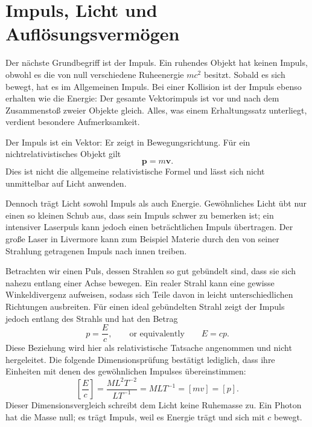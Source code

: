 \section{Impuls, Licht und Auflösungsvermögen}

Der nächste Grundbegriff ist der Impuls. Ein ruhendes Objekt hat keinen Impuls, obwohl es die von null verschiedene Ruheenergie \(mc^2\) besitzt. Sobald es sich bewegt, hat es im Allgemeinen Impuls. Bei einer Kollision ist der Impuls ebenso erhalten wie die Energie: Der gesamte Vektorimpuls ist vor und nach dem Zusammenstoß zweier Objekte gleich. Alles, was einem Erhaltungssatz unterliegt, verdient besondere Aufmerksamkeit.

Der Impuls ist ein Vektor: Er zeigt in Bewegungsrichtung. Für ein nichtrelativistisches Objekt gilt
\begin{equation}
\mathbf p=m\mathbf v.
\end{equation}
Dies ist nicht die allgemeine relativistische Formel und lässt sich nicht unmittelbar auf Licht anwenden.

Dennoch trägt Licht sowohl Impuls als auch Energie. Gewöhnliches Licht übt nur einen so kleinen Schub aus, dass sein Impuls schwer zu bemerken ist; ein intensiver Laserpuls kann jedoch einen beträchtlichen Impuls übertragen. Der große Laser in Livermore kann zum Beispiel Materie durch den von seiner Strahlung getragenen Impuls nach innen treiben.

Betrachten wir einen Puls, dessen Strahlen so gut gebündelt sind, dass sie sich nahezu entlang einer Achse bewegen. Ein realer Strahl kann eine gewisse Winkeldivergenz aufweisen, sodass sich Teile davon in leicht unterschiedlichen Richtungen ausbreiten. Für einen ideal gebündelten Strahl zeigt der Impuls jedoch entlang des Strahls und hat den Betrag
\begin{equation}
p=\frac{E}{c},
\qquad\text{or equivalently}\qquad
E=cp.
\end{equation}
Diese Beziehung wird hier als relativistische Tatsache angenommen und nicht hergeleitet. Die folgende Dimensionsprüfung bestätigt lediglich, dass ihre Einheiten mit denen des gewöhnlichen Impulses übereinstimmen:
\begin{equation}
\left[\frac{E}{c}\right]
=
\frac{M L^2 T^{-2}}{L T^{-1}}
=
M L T^{-1}
=
[m v]
=
[p].
\end{equation}
Dieser Dimensionsvergleich schreibt dem Licht keine Ruhemasse zu. Ein Photon hat die Masse null; es trägt Impuls, weil es Energie trägt und sich mit \(c\) bewegt.

